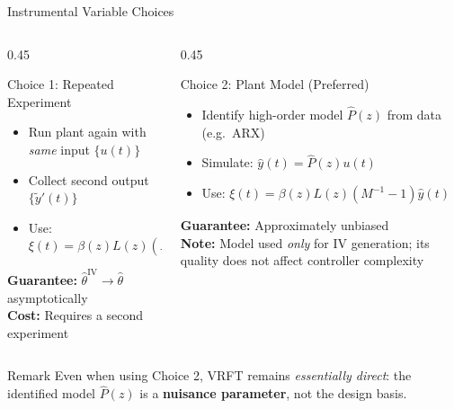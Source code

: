 \documentclass[hyperref={pdfpagemode=FullScreen},aspectratio=169]{beamer}
\begin{document}
\begin{frame}{Instrumental Variable Choices}
  \begin{columns}[T]
    \begin{column}{0.45\textwidth}
      \begin{exampleblock}{Choice 1: Repeated Experiment}
        \begin{itemize}
          \item Run plant again with \emph{same} input $\{u(t)\}$
          \item Collect second output $\{\tilde{y}'(t)\}$
          \item Use: $\xi(t) = \beta(z)L(z)(M^{-1}-1)\tilde{y}'(t)$
        \end{itemize}
        \vspace{0.3em}
        \textbf{Guarantee:} $\hat{\theta}^{\mathrm{IV}} \to \hat{\theta}$ asymptotically\\[0.2em]
        \textbf{Cost:} Requires a second experiment
      \end{exampleblock}
    \end{column}
    \begin{column}{0.45\textwidth}
      \begin{exampleblock}{Choice 2: Plant Model (Preferred)}
        \begin{itemize}
          \item Identify high-order model $\hat{P}(z)$ from data (e.g.\ ARX)
          \item Simulate: $\hat{y}(t) = \hat{P}(z)u(t)$
          \item Use: $\xi(t) = \beta(z)L(z)(M^{-1}-1)\hat{y}(t)$
        \end{itemize}
        \textbf{Guarantee:} Approximately unbiased\\[0.2em]
        \textbf{Note:} Model used \emph{only} for IV generation; its quality does not affect controller complexity
      \end{exampleblock}
    \end{column}
  \end{columns}
  \begin{block}{Remark}
    Even when using Choice 2, VRFT remains \emph{essentially direct}: the identified model $\hat{P}(z)$ is a \textbf{nuisance parameter}, not the design basis.
  \end{block}
\end{frame}
\end{document}
